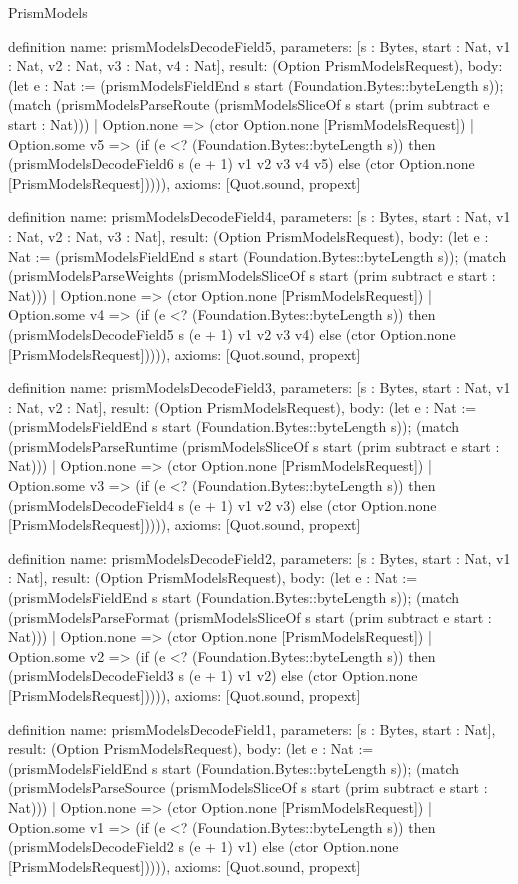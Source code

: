 \begin{lexlean}{PrismModels}
\begin{semanticmodule}
definition{
  name: prismModelsDecodeField5,
  parameters: [s : Bytes, start : Nat, v1 : Nat, v2 : Nat, v3 : Nat, v4 : Nat],
  result: (Option PrismModelsRequest),
  body: (let e : Nat := (prismModelsFieldEnd s start (Foundation.Bytes::byteLength s)); (match (prismModelsParseRoute (prismModelsSliceOf s start (prim subtract e start : Nat)))
    | Option.none => (ctor Option.none [PrismModelsRequest])
    | Option.some v5 => (if (e <? (Foundation.Bytes::byteLength s)) then (prismModelsDecodeField6 s (e + 1) v1 v2 v3 v4 v5) else (ctor Option.none [PrismModelsRequest])))),
  axioms: [Quot.sound, propext]
}

definition{
  name: prismModelsDecodeField4,
  parameters: [s : Bytes, start : Nat, v1 : Nat, v2 : Nat, v3 : Nat],
  result: (Option PrismModelsRequest),
  body: (let e : Nat := (prismModelsFieldEnd s start (Foundation.Bytes::byteLength s)); (match (prismModelsParseWeights (prismModelsSliceOf s start (prim subtract e start : Nat)))
    | Option.none => (ctor Option.none [PrismModelsRequest])
    | Option.some v4 => (if (e <? (Foundation.Bytes::byteLength s)) then (prismModelsDecodeField5 s (e + 1) v1 v2 v3 v4) else (ctor Option.none [PrismModelsRequest])))),
  axioms: [Quot.sound, propext]
}

definition{
  name: prismModelsDecodeField3,
  parameters: [s : Bytes, start : Nat, v1 : Nat, v2 : Nat],
  result: (Option PrismModelsRequest),
  body: (let e : Nat := (prismModelsFieldEnd s start (Foundation.Bytes::byteLength s)); (match (prismModelsParseRuntime (prismModelsSliceOf s start (prim subtract e start : Nat)))
    | Option.none => (ctor Option.none [PrismModelsRequest])
    | Option.some v3 => (if (e <? (Foundation.Bytes::byteLength s)) then (prismModelsDecodeField4 s (e + 1) v1 v2 v3) else (ctor Option.none [PrismModelsRequest])))),
  axioms: [Quot.sound, propext]
}

definition{
  name: prismModelsDecodeField2,
  parameters: [s : Bytes, start : Nat, v1 : Nat],
  result: (Option PrismModelsRequest),
  body: (let e : Nat := (prismModelsFieldEnd s start (Foundation.Bytes::byteLength s)); (match (prismModelsParseFormat (prismModelsSliceOf s start (prim subtract e start : Nat)))
    | Option.none => (ctor Option.none [PrismModelsRequest])
    | Option.some v2 => (if (e <? (Foundation.Bytes::byteLength s)) then (prismModelsDecodeField3 s (e + 1) v1 v2) else (ctor Option.none [PrismModelsRequest])))),
  axioms: [Quot.sound, propext]
}

definition{
  name: prismModelsDecodeField1,
  parameters: [s : Bytes, start : Nat],
  result: (Option PrismModelsRequest),
  body: (let e : Nat := (prismModelsFieldEnd s start (Foundation.Bytes::byteLength s)); (match (prismModelsParseSource (prismModelsSliceOf s start (prim subtract e start : Nat)))
    | Option.none => (ctor Option.none [PrismModelsRequest])
    | Option.some v1 => (if (e <? (Foundation.Bytes::byteLength s)) then (prismModelsDecodeField2 s (e + 1) v1) else (ctor Option.none [PrismModelsRequest])))),
  axioms: [Quot.sound, propext]
}


\end{semanticmodule}
\end{lexlean}
